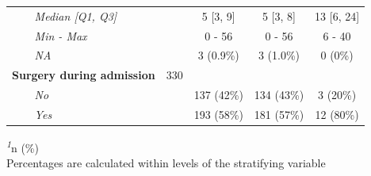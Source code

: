 \documentclass[
]{article}
\begin{document}
\begin{table}[t]
\begin{tabular*}{0.7\linewidth}{@{\extracolsep{\fill}}lcccc}
{\itshape     Median {[}Q1, Q3{]}} &  & 5 {[}3, 9{]} & 5 {[}3, 8{]} & 13 {[}6, 24{]} \\ 
{\itshape     Min - Max} &  & 0 - 56 & 0 - 56 & 6 - 40 \\ 
{\itshape     NA} &  & 3 (0.9\%) & 3 (1.0\%) & 0 (0\%) \\ 
{\bfseries Surgery during admission} & 330 &  &  &  \\ 
{\itshape     No} &  & 137 (42\%) & 134 (43\%) & 3 (20\%) \\ 
{\itshape     Yes} &  & 193 (58\%) & 181 (57\%) & 12 (80\%) \\ 
\bottomrule
\end{tabular*}
\begin{minipage}{\linewidth}
\textsuperscript{\textit{1}}n (\%)\\
Percentages are calculated within levels of the stratifying 
    variable\\
\end{minipage}
\end{table}
\end{document}
